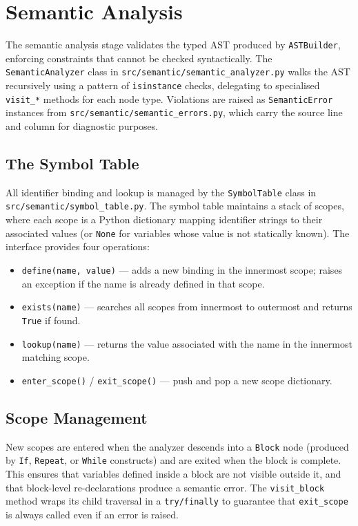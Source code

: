 \section{Semantic Analysis}

The semantic analysis stage validates the typed AST produced by \texttt{ASTBuilder}, enforcing constraints that cannot be checked syntactically. The \texttt{SemanticAnalyzer} class in \texttt{src/semantic/semantic\_analyzer.py} walks the AST recursively using a pattern of \texttt{isinstance} checks, delegating to specialised \texttt{visit\_*} methods for each node type. Violations are raised as \texttt{SemanticError} instances from \texttt{src/semantic/semantic\_errors.py}, which carry the source line and column for diagnostic purposes.

\subsection*{The Symbol Table}

All identifier binding and lookup is managed by the \texttt{SymbolTable} class in \texttt{src/semantic/symbol\_table.py}. The symbol table maintains a stack of scopes, where each scope is a Python dictionary mapping identifier strings to their associated values (or \texttt{None} for variables whose value is not statically known). The interface provides four operations:

\begin{itemize}
    \item[-] \texttt{define(name, value)} --- adds a new binding in the innermost scope; raises an exception if the name is already defined in that scope.
    \item[-] \texttt{exists(name)} --- searches all scopes from innermost to outermost and returns \texttt{True} if found.
    \item[-] \texttt{lookup(name)} --- returns the value associated with the name in the innermost matching scope.
    \item[-] \texttt{enter\_scope()} / \texttt{exit\_scope()} --- push and pop a new scope dictionary.
\end{itemize}

\subsection*{Scope Management}

New scopes are entered when the analyzer descends into a \texttt{Block} node (produced by \texttt{If}, \texttt{Repeat}, or \texttt{While} constructs) and are exited when the block is complete. This ensures that variables defined inside a block are not visible outside it, and that block-level re-declarations produce a semantic error. The \texttt{visit\_block} method wraps its child traversal in a \texttt{try/finally} to guarantee that \texttt{exit\_scope} is always called even if an error is raised.

